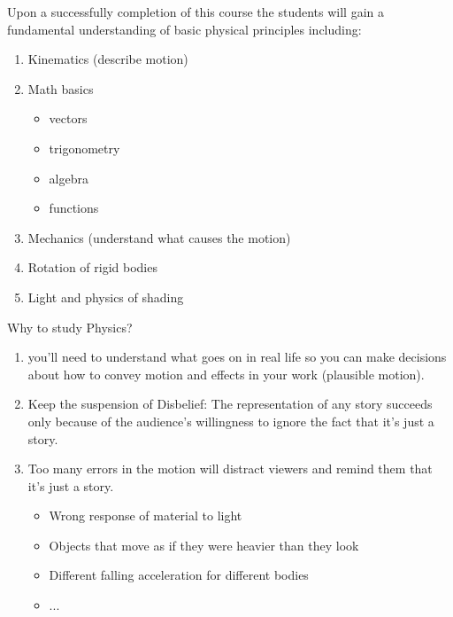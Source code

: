 \documentclass[]{beamer}
\begin{document}
\begin{frame}
  Upon a successfully completion of this course the students will gain a fundamental understanding of basic physical principles including:
  
  \begin{enumerate}
  \item Kinematics (describe motion)
  \pause
  \item Math basics 
  \pause
  \begin{itemize}
  \item vectors
  \item trigonometry
  \item algebra
  \item functions
  \end{itemize}
  \pause
  \item  Mechanics (understand what causes the motion)
  \pause
  \item Rotation of rigid bodies \pause
  \item Light and physics of shading
  \end{enumerate}
  
  
  
   \end{frame}
   
  
  



\begin{frame}

  Why to study Physics?
  
  \begin{enumerate}
   \item you’ll need to understand what goes on in real life so you can make decisions about
  how to convey motion and effects in your work (plausible motion).
  \pause
  \item Keep the suspension of Disbelief: The representation of any story succeeds only because of the
  audience’s willingness to ignore the fact that it’s just a story.
  \pause
  \item Too many errors in the motion will distract viewers and remind them that it’s just a
  story. 
  \pause
  \begin{itemize}
  \item Wrong response of material to light
  \item Objects that move as if they were heavier than they look 
  \item Different falling acceleration for different bodies
  \item ...
  \end{itemize}
  \end{enumerate}
  
  
   \end{frame}
   
\end{document}
